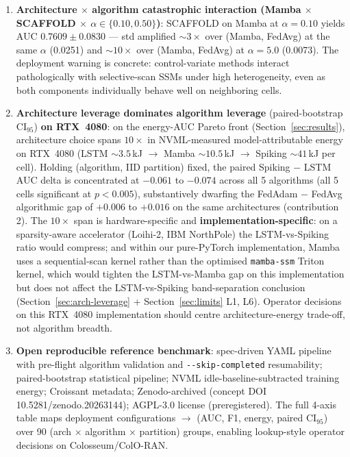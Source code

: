 \documentclass[journal]{IEEEtran}
\begin{document}
\begin{enumerate}
    \item \textbf{Architecture $\times$ algorithm catastrophic interaction (Mamba $\times$ SCAFFOLD $\times$ $\alpha\in\{0.10, 0.50\}$)}: SCAFFOLD on Mamba at $\alpha=0.10$ yields AUC $0.7609 \pm 0.0830$ --- std amplified $\sim 3\times$ over (Mamba, FedAvg) at the same $\alpha$ (0.0251) and $\sim 10\times$ over (Mamba, FedAvg) at $\alpha=5.0$ (0.0073). The deployment warning is concrete: control-variate methods interact pathologically with selective-scan SSMs under high heterogeneity, even as both components individually behave well on neighboring cells.

    \item \textbf{Architecture leverage dominates algorithm leverage} (paired-bootstrap CI$_{95}$) \textbf{on RTX~4080}: on the energy-AUC Pareto front (Section~\ref{sec:results}), architecture choice spans $10\times$ in NVML-measured model-attributable energy on RTX~4080 (LSTM $\sim 3.5$\,kJ $\rightarrow$ Mamba $\sim 10.5$\,kJ $\rightarrow$ Spiking $\sim 41$\,kJ per cell). Holding (algorithm, IID partition) fixed, the paired Spiking $-$ LSTM AUC delta is concentrated at $-0.061$ to $-0.074$ across all 5 algorithms (all 5 cells significant at $p<0.005$), substantively dwarfing the FedAdam $-$ FedAvg algorithmic gap of $+0.006$ to $+0.016$ on the same architectures (contribution 2). The $10\times$ span is hardware-specific and \textbf{implementation-specific}: on a sparsity-aware accelerator (Loihi-2, IBM NorthPole) the LSTM-vs-Spiking ratio would compress; and within our pure-PyTorch implementation, Mamba uses a sequential-scan kernel rather than the optimised \lstinline|mamba-ssm| Triton kernel, which would tighten the LSTM-vs-Mamba gap on this implementation but does not affect the LSTM-vs-Spiking band-separation conclusion (Section~\ref{sec:arch-leverage} + Section~\ref{sec:limits} L1, L6). Operator decisions on this RTX~4080 implementation should centre architecture-energy trade-off, not algorithm breadth.

    \item \textbf{Open reproducible reference benchmark}: spec-driven YAML pipeline with pre-flight algorithm validation and \lstinline|--skip-completed| resumability; paired-bootstrap statistical pipeline; NVML idle-baseline-subtracted training energy; Croissant metadata; Zenodo-archived (concept DOI 10.5281/zenodo.20263144); AGPL-3.0 license (preregistered). The full 4-axis table maps deployment configurations $\rightarrow$ (AUC, F1, energy, paired CI$_{95}$) over 90 (arch $\times$ algorithm $\times$ partition) groups, enabling lookup-style operator decisions on Colosseum/ColO-RAN.
\end{enumerate}
\end{document}
